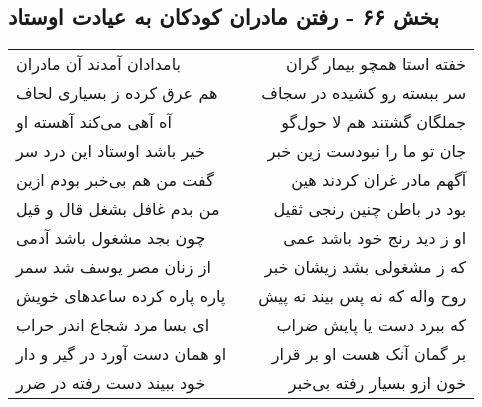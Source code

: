 \begin{center}
\section*{بخش ۶۶ - رفتن مادران کودکان به عیادت اوستاد}
\label{sec:sh066}
\begin{longtable}{l p{0.5cm} r}
بامدادان آمدند آن مادران
&&
خفته استا همچو بیمار گران
\\
هم عرق کرده ز بسیاری لحاف
&&
سر ببسته رو کشیده در سجاف
\\
آه آهی می‌کند آهسته او
&&
جملگان گشتند هم لا حول‌گو
\\
خیر باشد اوستاد این درد سر
&&
جان تو ما را نبودست زین خبر
\\
گفت من هم بی‌خبر بودم ازین
&&
آگهم مادر غران کردند هین
\\
من بدم غافل بشغل قال و قیل
&&
بود در باطن چنین رنجی ثقیل
\\
چون بجد مشغول باشد آدمی
&&
او ز دید رنج خود باشد عمی
\\
از زنان مصر یوسف شد سمر
&&
که ز مشغولی بشد زیشان خبر
\\
پاره پاره کرده ساعدهای خویش
&&
روح واله که نه پس بیند نه پیش
\\
ای بسا مرد شجاع اندر حراب
&&
که ببرد دست یا پایش ضراب
\\
او همان دست آورد در گیر و دار
&&
بر گمان آنک هست او بر قرار
\\
خود ببیند دست رفته در ضرر
&&
خون ازو بسیار رفته بی‌خبر
\\
\end{longtable}
\end{center}
